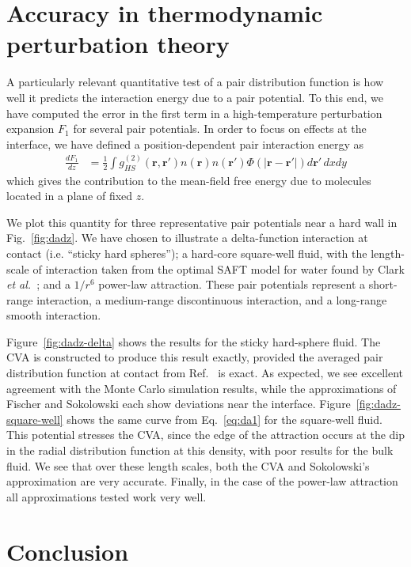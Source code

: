 \documentclass[letterpaper,twocolumn,amsmath,amssymb,pre,aps,10pt]{revtex4-1}
\newcommand{\rr}{\textbf{r}}
\begin{document}
\section{Accuracy in thermodynamic perturbation theory}

A particularly relevant quantitative test of a pair distribution
function is how well it predicts the interaction energy due to a pair
potential.  To this end, we have computed the error in the first term
in a high-temperature perturbation expansion $F_1$
for several pair potentials.  In order to focus on effects at the
interface, we have defined a position-dependent pair interaction
energy as
\begin{align}
  \frac{dF_1}{dz} &=
  \tfrac12 \int g^{(2)}_{HS}(\rr,\rr')n(\rr)n(\rr')\Phi(|\rr-\rr'|)
  d\rr'\, dxdy\label{eq:da1}
\end{align}
which gives the contribution to the mean-field free energy due to
molecules located in a plane of fixed $z$.

We plot this quantity for three representative
pair potentials near a hard wall in Fig.~\ref{fig:dadz}.  We have
chosen to illustrate a delta-function interaction at contact
(i.e. ``sticky hard spheres''); a hard-core square-well fluid, with
the length-scale of interaction taken from the optimal SAFT model for
water found by Clark \emph{et al.}~\cite{clark2006developing}; and a
$1/r^6$ power-law attraction.  These pair potentials represent a
short-range interaction, a medium-range discontinuous interaction, and
a long-range smooth interaction.

Figure~\ref{fig:dadz-delta} shows the results for the sticky
hard-sphere fluid.  The CVA is constructed to produce this
result exactly, provided the averaged pair distribution function at
contact from Ref.~ is exact.  As expected,
we see excellent agreement with the Monte Carlo simulation results,
while the approximations of Fischer and Sokolowski each show
deviations near the interface.  Figure~\ref{fig:dadz-square-well}
shows the same curve from Eq.~\ref{eq:da1} for the square-well fluid.
This potential stresses the CVA, since the edge of the attraction
occurs at the dip in the radial distribution function at this density,
with poor results for the bulk fluid.  We see that over these length
scales, both the CVA and Sokolowski's approximation are very accurate.
Finally, in the case of the power-law attraction all approximations
tested work very well.

\section{Conclusion}
\end{document}
